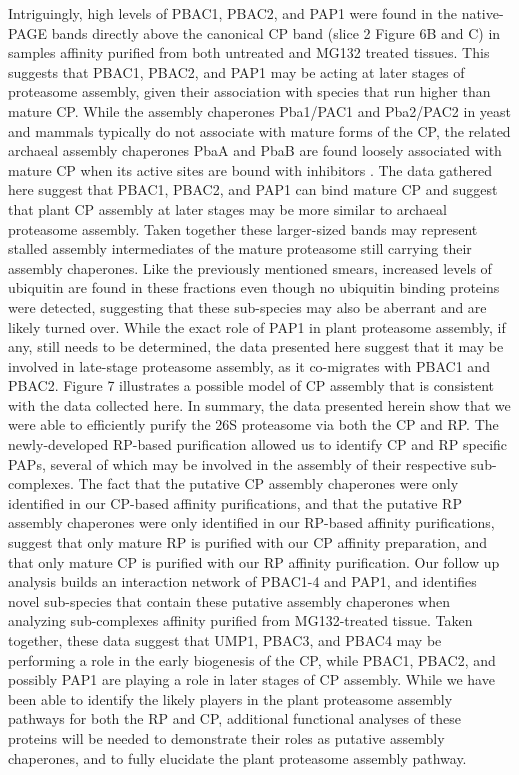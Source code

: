 Intriguingly, high levels of PBAC1, PBAC2, and PAP1 were found in the native-PAGE bands directly above the canonical CP band (slice 2 Figure 6B and C) in samples affinity purified from both untreated and MG132 treated tissues. This suggests that PBAC1, PBAC2, and PAP1 may be acting at later stages of proteasome assembly, given their association with species that run higher than mature CP. While the assembly chaperones Pba1/PAC1 and Pba2/PAC2 in yeast and mammals typically do not associate with mature forms of the CP, the related archaeal assembly chaperones PbaA and PbaB are found loosely associated with mature CP when its active sites are bound with inhibitors \citep{kusmierczyk11}. The data gathered here suggest that PBAC1, PBAC2, and PAP1 can bind mature CP and suggest that plant CP assembly at later stages may be more similar to archaeal proteasome assembly. Taken together these larger-sized bands may represent stalled assembly intermediates of the mature proteasome still carrying their assembly chaperones. Like the previously mentioned smears, increased levels of ubiquitin are found in these fractions even though no ubiquitin binding proteins were detected, suggesting that these sub-species may also be aberrant and are likely turned over. While the exact role of PAP1 in plant proteasome assembly, if any, still needs to be determined, the data presented here suggest that it may be involved in late-stage proteasome assembly, as it co-migrates with PBAC1 and PBAC2. Figure 7 illustrates a possible model of CP assembly that is consistent with the data collected here. 
In summary, the data presented herein show that we were able to efficiently purify the 26S proteasome via both the CP and RP. The newly-developed RP-based purification allowed us to identify CP and RP specific PAPs, several of which may be involved in the assembly of their respective sub-complexes. The fact that the putative CP assembly chaperones were only identified in our CP-based affinity purifications, and that the putative RP assembly chaperones were only identified in our RP-based affinity purifications, suggest that only mature RP is purified with our CP affinity preparation, and that only mature CP is purified with our RP affinity purification. Our follow up analysis builds an interaction network of PBAC1-4 and PAP1, and identifies novel sub-species that contain these putative assembly chaperones when analyzing sub-complexes affinity purified from MG132-treated tissue. Taken together, these data suggest that UMP1, PBAC3, and PBAC4 may be performing a role in the early biogenesis of the CP, while PBAC1, PBAC2, and possibly PAP1 are playing a role in later stages of CP assembly. While we have been able to identify the likely players in the plant proteasome assembly pathways for both the RP and CP, additional functional analyses of these proteins will be needed to demonstrate their roles as putative assembly chaperones, and to fully elucidate the plant proteasome assembly pathway.  

